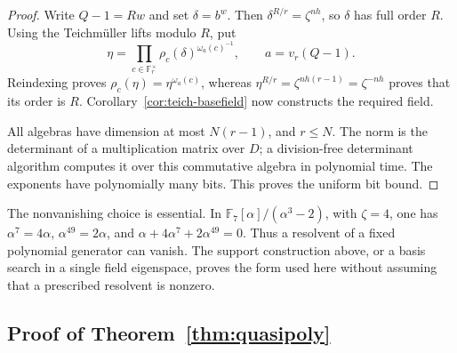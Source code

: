 \documentclass[11pt]{article}
\newcommand{\F}{\mathbb F}
\theoremstyle{definition}
\theoremstyle{remark}
\begin{document}
\begin{proof}
Write $Q-1=Rw$ and set $\delta=b^w$. Then
$\delta^{R/r}=\zeta^{nh}$, so $\delta$ has full order $R$.
Using the Teichm\"uller lifts modulo $R$, put
\[
 \eta=\prod_{c\in\F_r^\times}
          \rho_c(\delta)^{\omega_a(c)^{-1}},
 \qquad a=v_r(Q-1).
\]
Reindexing proves $\rho_c(\eta)=\eta^{\omega_a(c)}$,
whereas
$\eta^{R/r}=\zeta^{nh(r-1)}=\zeta^{-nh}$ proves
that its order is $R$. Corollary~\ref{cor:teich-basefield} now constructs
the required field.

All algebras have dimension at most $N(r-1)$, and $r\leq N$.
The norm is the determinant of a multiplication matrix over $D$;
a division-free determinant algorithm computes it over this
commutative algebra in polynomial time. The exponents have
polynomially many bits. This proves the uniform bit bound.
\end{proof}

The nonvanishing choice is essential. In
$\F_7[\alpha]/(\alpha^3-2)$, with $\zeta=4$, one has
$\alpha^7=4\alpha$, $\alpha^{49}=2\alpha$, and
$\alpha+4\alpha^7+2\alpha^{49}=0$.
Thus a resolvent of a fixed polynomial generator can vanish.
The support construction above, or a basis search in a single
field eigenspace, proves the form used here without assuming
that a prescribed resolvent is nonzero.


\subsection{Proof of Theorem~\ref{thm:quasipoly}}
\end{document}
